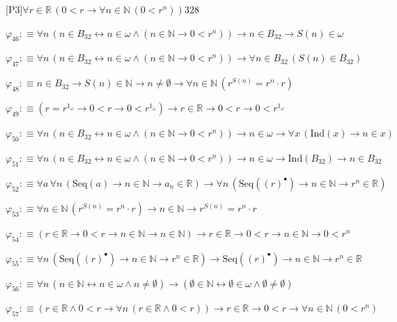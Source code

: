 \begin{fullproof}{[P3]}{$\forall r \in \mathbb{R}\,(0 < r \to \forall n \in \mathbb{N}\,(0 < {{r}^{n}}))$}{328}
\begin{abbrevlist}
\item $\varphi_{46} :\equiv \forall n\,(n \in B_{32} \leftrightarrow n \in \omega \land (n \in \mathbb{N} \to 0 < {{r}^{n}})) \to n \in B_{32} \to S(n) \in \omega$
\item $\varphi_{47} :\equiv \forall n\,(n \in B_{32} \leftrightarrow n \in \omega \land (n \in \mathbb{N} \to 0 < {{r}^{n}})) \to \forall n \in B_{32}\,(S(n) \in B_{32})$
\item $\varphi_{48} :\equiv n \in B_{32} \to S(n) \in \mathbb{N} \to n \neq \emptyset \to \forall n \in \mathbb{N}\,({{r}^{S(n)}} = {{r}^{n}} \cdot r)$
\item $\varphi_{49} :\equiv (r = {{r}^{1_{\omega}}} \to 0 < r \to 0 < {{r}^{1_{\omega}}}) \to r \in \mathbb{R} \to 0 < r \to 0 < {{r}^{1_{\omega}}}$
\item $\varphi_{50} :\equiv \forall n\,(n \in B_{32} \leftrightarrow n \in \omega \land (n \in \mathbb{N} \to 0 < {{r}^{n}})) \to n \in \omega \to \forall x\,(\mathrm{Ind}(x) \to n \in x)$
\item $\varphi_{51} :\equiv \forall n\,(n \in B_{32} \leftrightarrow n \in \omega \land (n \in \mathbb{N} \to 0 < {{r}^{n}})) \to n \in \omega \to \mathrm{Ind}(B_{32}) \to n \in B_{32}$
\item $\varphi_{52} :\equiv \forall a\,\forall n\,(\mathrm{Seq}(a) \to n \in \mathbb{N} \to a_{n} \in \mathbb{R}) \to \forall n\,(\mathrm{Seq}({(r)^{\bullet}}) \to n \in \mathbb{N} \to {{r}^{n}} \in \mathbb{R})$
\item $\varphi_{53} :\equiv \forall n \in \mathbb{N}\,({{r}^{S(n)}} = {{r}^{n}} \cdot r) \to n \in \mathbb{N} \to {{r}^{S(n)}} = {{r}^{n}} \cdot r$
\item $\varphi_{54} :\equiv (r \in \mathbb{R} \to 0 < r \to n \in \mathbb{N} \to n \in \mathbb{N}) \to r \in \mathbb{R} \to 0 < r \to n \in \mathbb{N} \to 0 < {{r}^{n}}$
\item $\varphi_{55} :\equiv \forall n\,(\mathrm{Seq}({(r)^{\bullet}}) \to n \in \mathbb{N} \to {{r}^{n}} \in \mathbb{R}) \to \mathrm{Seq}({(r)^{\bullet}}) \to n \in \mathbb{N} \to {{r}^{n}} \in \mathbb{R}$
\item $\varphi_{56} :\equiv \forall n\,(n \in \mathbb{N} \leftrightarrow n \in \omega \land n \neq \emptyset) \to (\emptyset \in \mathbb{N} \leftrightarrow \emptyset \in \omega \land \emptyset \neq \emptyset)$
\item $\varphi_{57} :\equiv (r \in \mathbb{R} \land 0 < r \to \forall n\,(r \in \mathbb{R} \land 0 < r)) \to r \in \mathbb{R} \to 0 < r \to \forall n \in \mathbb{N}\,(0 < {{r}^{n}})$

\end{abbrevlist}
\end{fullproof}
